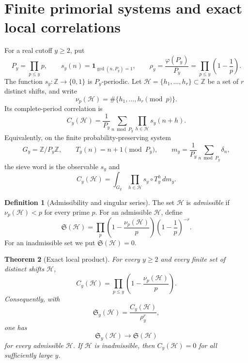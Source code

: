 \documentclass[11pt]{article}
\newtheorem{theorem}{Theorem}[section]
\theoremstyle{definition}
\newtheorem{definition}[theorem]{Definition}
\theoremstyle{remark}
\newcommand{\Z}{\mathbb Z}
\newcommand{\cH}{\mathcal H}
\newcommand{\one}{\mathbf 1}
\begin{document}
\section{Finite primorial systems and exact local correlations}\label{sec:crt}

For a real cutoff $y\ge2$, put
\begin{equation}\label{eq:primorial-density}
    P_y=\prod_{p\le y}p,
    \qquad
    s_y(n)=\one_{\gcd(n,P_y)=1},
    \qquad
    \rho_y=\frac{\varphi(P_y)}{P_y}
           =\prod_{p\le y}\left(1-\frac1p\right).
\end{equation}
The function $s_y:\Z\to\{0,1\}$ is $P_y$-periodic.  Let
$\cH=\{h_1,\ldots,h_r\}\subset\Z$ be a set of $r$ distinct shifts, and write
\begin{equation}\label{eq:nu-p}
    \nu_p(\cH)=\#\{h_1,\ldots,h_r\pmod p\}.
\end{equation}
Its complete-period correlation is
\begin{equation}\label{eq:complete-correlation}
    C_y(\cH)
    =\frac1{P_y}\sum_{n\bmod P_y}\prod_{h\in\cH}s_y(n+h).
\end{equation}
Equivalently, on the finite probability-preserving system
\begin{equation}\label{eq:finite-dynamical-system}
    G_y=\Z/P_y\Z,
    \qquad T_y(n)=n+1\pmod{P_y},
    \qquad m_y=\frac1{P_y}\sum_{n\bmod P_y}\delta_n,
\end{equation}
the sieve word is the observable $s_y$ and
\begin{equation}\label{eq:orbit-correlation}
    C_y(\cH)=\int_{G_y}\prod_{h\in\cH}s_y\circ T_y^h\,dm_y.
\end{equation}

\begin{definition}[Admissibility and singular series]\label{def:singular-series}
The set $\cH$ is \emph{admissible} if $\nu_p(\cH)<p$ for every prime $p$.  For an admissible $\cH$, define
\begin{equation}\label{eq:singular-series}
    \mathfrak S(\cH)
    =\prod_p
      \left(1-\frac{\nu_p(\cH)}p\right)
      \left(1-\frac1p\right)^{-r}.
\end{equation}
For an inadmissible set we put $\mathfrak S(\cH)=0$.
\end{definition}

\begin{theorem}[Exact local product]\label{thm:crt}
For every $y\ge2$ and every finite set of distinct shifts $\cH$,
\begin{equation}\label{eq:crt-product}
    C_y(\cH)
    =\prod_{p\le y}\left(1-\frac{\nu_p(\cH)}p\right).
\end{equation}
Consequently, with
\begin{equation}\label{eq:truncated-singular-series}
    \mathfrak S_y(\cH)
    =\frac{C_y(\cH)}{\rho_y^r},
\end{equation}
one has
\begin{equation}\label{eq:singular-limit}
    \mathfrak S_y(\cH)\longrightarrow\mathfrak S(\cH)
\end{equation}
for every admissible $\cH$.  If $\cH$ is inadmissible, then $C_y(\cH)=0$ for all sufficiently large $y$.
\end{theorem}
\end{document}
